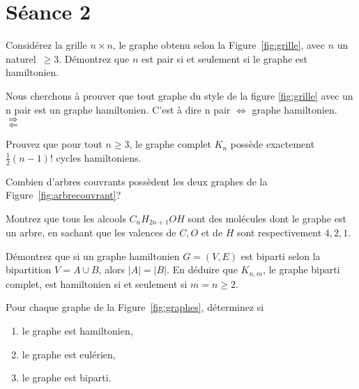 
\section{Séance 2}

\begin{exo}
Consid\'erez la grille $n \times n$, le graphe obtenu selon la Figure~\ref{fig:grille}, avec $n$ un naturel~$\geq 3$.
D\'emontrez que $n$ est pair si et seulement si le graphe est hamiltonien.
\end{exo}



Nous cherchons à prouver que tout graphe du style de la figure \ref{fig:grille} avec un n pair est un graphe hamiltonien. C'est à dire n pair $\Leftrightarrow$ graphe hamiltonien. \\

$\Rightarrow$ \\

$\Leftarrow$ \\

\begin{exo}
Prouvez que pour tout $n \geq 3$, le graphe complet $K_n$ poss\`ede exactement $\frac{1}{2}(n-1)!$ cycles hamiltoniens.
\end{exo}

\begin{exo}
Combien d'arbres couvrants poss\`edent les deux graphes de la Figure~\ref{fig:arbrecouvrant}?
\end{exo}



\begin{exo}
Montrez que tous les alcools $C_nH_{2n+1}OH$ sont des mol\'ecules dont le graphe est un arbre, en sachant que les valences de $C, O$ et de $H$ sont respectivement $4, 2, 1$.
\end{exo}

\begin{exo}
D\'emontrez que si un graphe hamiltonien $G = (V,E)$ est biparti selon la bipartition $V = A \cup B$, alors $|A|= |B|$. En d\'eduire que $K_{n,m}$, le graphe biparti complet, est hamiltonien si et seulement si $m=n \geq 2$.

\end{exo}

\begin{exo}
Pour chaque graphe de la Figure~\ref{fig:graphes}, d\'eterminez si 
\begin{enumerate}
\item le graphe est hamiltonien,
\item le graphe est eul\'erien,
\item le graphe est biparti.
\end{enumerate}
\end{exo}



\thispagestyle{empty}